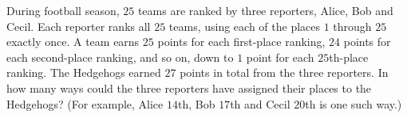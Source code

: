 During football season, $25$ teams are ranked by three reporters, Alice, Bob and Cecil. Each reporter ranks all $25$ teams, using each of the places $1$ through $25$ exactly once. A team earns $25$ points for each first-place ranking, $24$ points for each second-place ranking, and so on, down to $1$ point for each $25$th-place ranking. The Hedgehogs earned $27$ points in total from the three reporters. In how many ways could the three reporters have assigned their places to the Hedgehogs? (For example, Alice $14$th, Bob $17$th and Cecil $20$th is one such way.)
